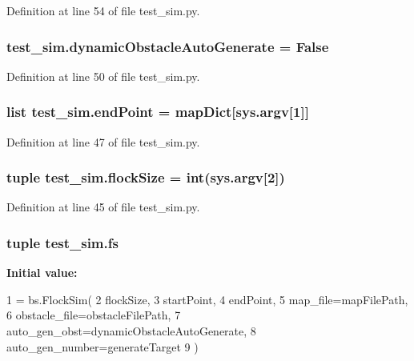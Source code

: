 Definition at line 54 of file test\-\_\-sim.\-py.

\hypertarget{namespacetest__sim_ac73cc5253c8afe364cddedc6a393f925}{
\subsubsection[{dynamic\-Obstacle\-Auto\-Generate}]{\setlength{\rightskip}{0pt plus 5cm}test\-\_\-sim.\-dynamic\-Obstacle\-Auto\-Generate = False}}\label{namespacetest__sim_ac73cc5253c8afe364cddedc6a393f925}


Definition at line 50 of file test\-\_\-sim.\-py.

\hypertarget{namespacetest__sim_a74c9f896f25a6236b948f451aaab30bf}{
\subsubsection[{end\-Point}]{\setlength{\rightskip}{0pt plus 5cm}list test\-\_\-sim.\-end\-Point = {\bf map\-Dict}\mbox{[}sys.\-argv\mbox{[}1\mbox{]}\mbox{]}}}\label{namespacetest__sim_a74c9f896f25a6236b948f451aaab30bf}


Definition at line 47 of file test\-\_\-sim.\-py.

\hypertarget{namespacetest__sim_ab2831c916fc9496cbc35d3dc973a3e9c}{
\subsubsection[{flock\-Size}]{\setlength{\rightskip}{0pt plus 5cm}tuple test\-\_\-sim.\-flock\-Size = int(sys.\-argv\mbox{[}2\mbox{]})}}\label{namespacetest__sim_ab2831c916fc9496cbc35d3dc973a3e9c}


Definition at line 45 of file test\-\_\-sim.\-py.

\hypertarget{namespacetest__sim_a2054957d15e42445f7dc826058f9799d}{
\subsubsection[{fs}]{\setlength{\rightskip}{0pt plus 5cm}tuple test\-\_\-sim.\-fs}}\label{namespacetest__sim_a2054957d15e42445f7dc826058f9799d}
{\bfseries Initial value\-:}
\begin{DoxyCode}
1 = bs.FlockSim(
2             flockSize,
3             startPoint,
4             endPoint,
5             map\_file=mapFilePath,
6             obstacle\_file=obstacleFilePath,
7             auto\_gen\_obst=dynamicObstacleAutoGenerate,
8             auto\_gen\_number=generateTarget
9         )
\end{DoxyCode}


